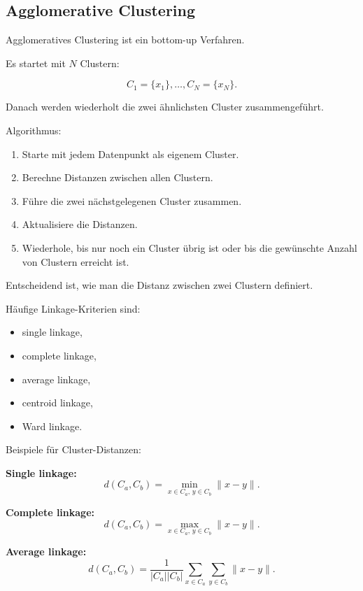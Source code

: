 \documentclass[11pt,a4paper]{scrartcl}
\begin{document}
\subsection{Agglomerative Clustering}

\begin{notebox}
    Agglomeratives Clustering ist ein bottom-up Verfahren.

    Es startet mit \(N\) Clustern:

    \[
        C_1=\{x_1\},\dots,C_N=\{x_N\}.
    \]

    Danach werden wiederholt die zwei ähnlichsten Cluster zusammengeführt.
\end{notebox}

\begin{solutionbox}
    Algorithmus:

    \begin{enumerate}
        \item Starte mit jedem Datenpunkt als eigenem Cluster.
        \item Berechne Distanzen zwischen allen Clustern.
        \item Führe die zwei nächstgelegenen Cluster zusammen.
        \item Aktualisiere die Distanzen.
        \item Wiederhole, bis nur noch ein Cluster übrig ist oder bis die
        gewünschte Anzahl von Clustern erreicht ist.
    \end{enumerate}
\end{solutionbox}

\begin{notebox}
    Entscheidend ist, wie man die Distanz zwischen zwei Clustern definiert.

    Häufige Linkage-Kriterien sind:

    \begin{itemize}
        \item single linkage,
        \item complete linkage,
        \item average linkage,
        \item centroid linkage,
        \item Ward linkage.
    \end{itemize}
\end{notebox}

\begin{calculationbox}
    Beispiele für Cluster-Distanzen:

    \textbf{Single linkage:}
    \[
        d(C_a,C_b)
        =
        \min_{x\in C_a,\,y\in C_b}
        \|x-y\|.
    \]

    \textbf{Complete linkage:}
    \[
        d(C_a,C_b)
        =
        \max_{x\in C_a,\,y\in C_b}
        \|x-y\|.
    \]

    \textbf{Average linkage:}
    \[
        d(C_a,C_b)
        =
        \frac{1}{|C_a||C_b|}
        \sum_{x\in C_a}
        \sum_{y\in C_b}
        \|x-y\|.
    \]
\end{calculationbox}
\end{document}
